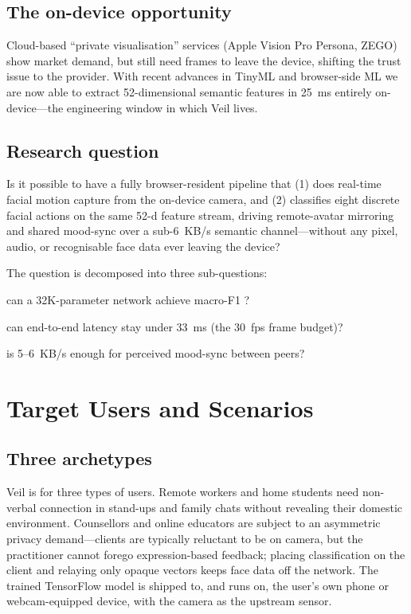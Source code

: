 \documentclass[11pt,a4paper]{article}
\begin{document}
\subsection{The on-device opportunity}
Cloud-based ``private visualisation'' services (Apple Vision Pro Persona, ZEGO) show market demand, but still need frames to leave the device, shifting the trust issue to the provider. With recent advances in TinyML  and browser-side ML  we are now able to extract 52-dimensional semantic features in 25~ms entirely on-device---the engineering window in which Veil lives.

\subsection{Research question}
Is it possible to have a fully browser-resident pipeline that (1) does real-time facial motion capture from the on-device camera, and (2) classifies eight discrete facial actions on the same 52-d feature stream, driving remote-avatar mirroring and shared mood-sync over a sub-6~KB/s semantic channel---without any pixel, audio, or recognisable face data ever leaving the device?

The question is decomposed into three sub-questions:

\begin{description}[leftmargin=2.2em,style=nextline,itemsep=0.2em]
  \item[(a) model] can a 32K-parameter network achieve macro-F1 ?
  \item[(b) deployment] can end-to-end latency stay under 33~ms (the 30~fps frame budget)?
  \item[(c) protocol] is 5--6~KB/s enough for perceived mood-sync between peers?
\end{description}

\section{Target Users and Scenarios}

\subsection{Three archetypes}
Veil is for three types of users. Remote workers and home students need non-verbal connection in stand-ups and family chats without revealing their domestic environment. Counsellors and online educators are subject to an asymmetric privacy demand---clients are typically reluctant to be on camera, but the practitioner cannot forego expression-based feedback; placing classification on the client and relaying only opaque vectors keeps face data off the network. The trained TensorFlow model is shipped to, and runs on, the user's own phone or webcam-equipped device, with the camera as the upstream sensor.
\end{document}
